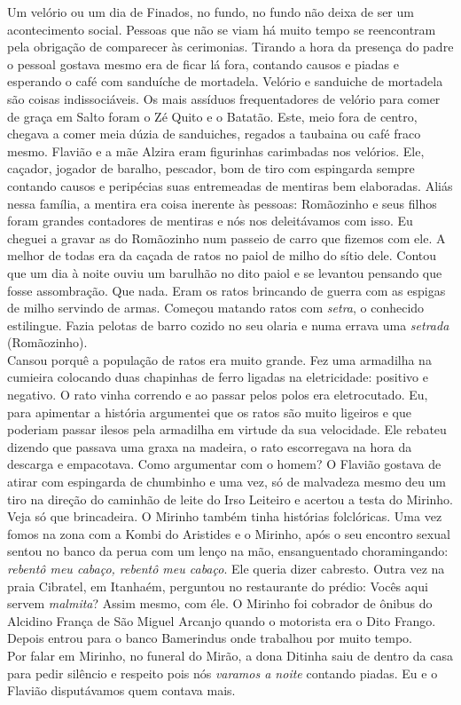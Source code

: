 \documentclass[12pt,brazil,]{book}
\begin{document}
Um velório ou um dia de Finados, no fundo, no fundo não deixa de ser um
acontecimento social. Pessoas que não se viam há muito tempo se
reencontram pela obrigação de comparecer às cerimonias. Tirando a hora
da presença do padre o pessoal gostava mesmo era de ficar lá fora,
contando causos e piadas e esperando o café com sanduíche de mortadela.
Velório e sanduiche de mortadela são coisas indissociáveis. Os mais
assíduos frequentadores de velório para comer de graça em Salto foram o
Zé Quito e o Batatão. Este, meio fora de centro, chegava a comer meia
dúzia de sanduiches, regados a taubaina ou café fraco mesmo. Flavião e a
mãe Alzira eram figurinhas carimbadas nos velórios. Ele, caçador,
jogador de baralho, pescador, bom de tiro com espingarda sempre contando
causos e peripécias suas entremeadas de mentiras bem elaboradas. Aliás
nessa família, a mentira era coisa inerente às pessoas: Romãozinho e
seus filhos foram grandes contadores de mentiras e nós nos deleitávamos
com isso. Eu cheguei a gravar as do Romãozinho num passeio de carro que
fizemos com ele. A melhor de todas era da caçada de ratos no paiol de
milho do sítio dele. Contou que um dia à noite ouviu um barulhão no dito
paiol e se levantou pensando que fosse assombração. Que nada. Eram os
ratos brincando de guerra com as espigas de milho servindo de armas.
Começou matando ratos com \emph{setra}, o conhecido estilingue. Fazia
pelotas de barro cozido no seu olaria e numa errava uma \emph{setrada}
(Romãozinho).\\
Cansou porquê a população de ratos era muito grande. Fez uma armadilha
na cumieira colocando duas chapinhas de ferro ligadas na eletricidade:
positivo e negativo. O rato vinha correndo e ao passar pelos polos era
eletrocutado. Eu, para apimentar a história argumentei que os ratos são
muito ligeiros e que poderiam passar ilesos pela armadilha em virtude da
sua velocidade. Ele rebateu dizendo que passava uma graxa na madeira, o
rato escorregava na hora da descarga e empacotava. Como argumentar com o
homem? O Flavião gostava de atirar com espingarda de chumbinho e uma
vez, só de malvadeza mesmo deu um tiro na direção do caminhão de leite
do Irso Leiteiro e acertou a testa do Mirinho.\\
Veja só que brincadeira. O Mirinho também tinha histórias folclóricas.
Uma vez fomos na zona com a Kombi do Aristides e o Mirinho, após o seu
encontro sexual sentou no banco da perua com um lenço na mão,
ensanguentado choramingando: \emph{rebentô meu cabaço, rebentô meu
cabaço}. Ele queria dizer cabresto. Outra vez na praia Cibratel, em
Itanhaém, perguntou no restaurante do prédio: Vocês aqui servem
\emph{malmita}? Assim mesmo, com éle. O Mirinho foi cobrador de ônibus
do Alcidino França de São Miguel Arcanjo quando o motorista era o Dito
Frango. Depois entrou para o banco Bamerindus onde trabalhou por muito
tempo.\\
Por falar em Mirinho, no funeral do Mirão, a dona Ditinha saiu de dentro
da casa para pedir silêncio e respeito pois nós \emph{varamos a noite}
contando piadas. Eu e o Flavião disputávamos quem contava mais.
\end{document}
